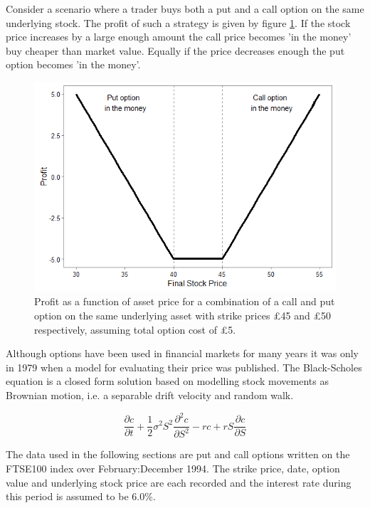 \documentclass{sig-alternate-05-2015}
\begin{document}
Consider a scenario where a trader buys both a put and a call option on the same underlying stock. The profit of such a strategy is given by figure \ref{fig:Q1plot}. If the stock price increases by a large enough amount the call price becomes 'in the money' buy cheaper than market value. Equally if the price decreases enough the put option becomes 'in the money'. 

\begin{figure}
	\includegraphics[width=\linewidth]{Q1plot.png}
	\centering
	\caption{Profit as a function of asset price for a combination of a call and put option on the same underlying asset with strike prices £45 and £50 respectively, assuming total option cost of £5.}
			\label{fig:Q1plot}
\end{figure} 

Although options have been used in financial markets for many years it was only in 1979 when a model for evaluating their price was published\cite{blackscholes}. The Black-Scholes equation is a closed form solution based on modelling stock movements as Brownian motion, i.e. a separable drift velocity and random walk. 

\begin{equation}
\frac{\partial c}{\partial t} + \frac{1}{2}\sigma^2S^2\frac{\partial^2c}{\partial S^2} - rc + rS\frac{\partial c}{\partial S}
\label{eq:blackscholes}
\end{equation}

The data used in the following sections are put and call options written on the FTSE100 index over February:December 1994. The strike price, date, option value and underlying stock price are each recorded and the interest rate during this period is assumed to be $6.0\%$.
\end{document}

